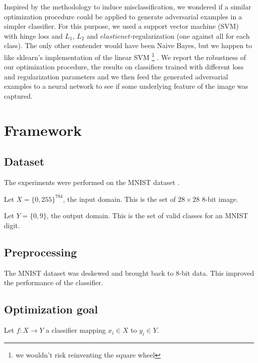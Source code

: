\documentclass{article} %
\begin{document}
Inspired by the methodology to induce misclassification, we wondered
if a similar optimization procedure could be applied to generate adversarial
examples in a simpler classifier. For this purpose, we used a support vector machine (SVM) with hinge loss and $L_1$, $L_2$ and $elasticnet$-regularization (one against all for each class). The only other contender would have been Naive Bayes,
but we happen to like sklearn's implementation of the linear SVM \footnote{we wouldn't
risk reinventing the square wheel} \citep{pedregosa_scikit-learn:_2011}.
We report the robustness of our optimization procedure, the results on classifiers
trained with different loss and regularization parameters and we then feed the 
generated adversarial examples to a neural network to see if some underlying
feature of the image was captured.


\section{Framework}

\subsection{Dataset}

The experiments were performed on the MNIST dataset \citep{lecun_mnist_1998}.

Let \begin{math} X=\{0, 255\}^{784} \end{math}, the input domain.
This is the set of $28\times28$ 8-bit image.

Let \begin{math} Y = \{0, 9\} \end{math}, the output domain.
This is the set of valid classes for an MNIST digit.


\subsection{Preprocessing}

The MNIST dataset was deskewed and brought back to 8-bit data. This improved the performance of the classifier.


\subsection{Optimization goal}

Let \begin{math} f:X \rightarrow  Y \end{math} a classifier mapping $x_i \in
X$ to $y_i \in Y$.
\end{document}
